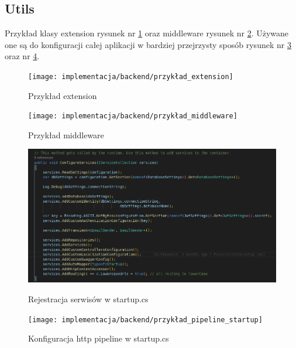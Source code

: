 \documentclass[a4paper,11pt]{report}
\begin{document}
\subsection{Utils}
Przykład klasy extension rysunek nr \ref{fig:gamitude_extension} oraz middleware rysunek nr \ref{fig:gamitude_middleware}.
Używane one są do konfiguracji całej aplikacji w bardziej przejrzysty sposób rysunek nr \ref{fig:gamitude_services_startup} oraz nr \ref{fig:gamitude_pipeline_startup}.
\begin{figure}[H]
	\centering
	\texttt{[image: implementacja/backend/przykład\_extension]}\\
	\caption{Przykład extension}
	\label{fig:gamitude_extension}
\end{figure}
\begin{figure}[H]
	\centering
	\texttt{[image: implementacja/backend/przykład\_middleware]}\\
	\caption{Przykład middleware}
	\label{fig:gamitude_middleware}
\end{figure}
\begin{figure}[H]
	\centering
	\includegraphics[scale=0.4]{implementacja/backend/register_services_startup}\\
	\caption{Rejestracja serwisów w startup.cs}
	\label{fig:gamitude_services_startup}
\end{figure}
\begin{figure}[H]
	\centering
	\texttt{[image: implementacja/backend/przykład\_pipeline\_startup]}\\
	\caption{Konfiguracja http pipeline w startup.cs}
	\label{fig:gamitude_pipeline_startup}
\end{figure}
\end{document}
